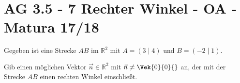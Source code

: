 \section{AG 3.5 - 7 Rechter Winkel - OA - Matura 17/18}

\begin{beispiel}[AG 3.5]{1} %
Gegeben ist eine Strecke $AB$ im $\mathbb{R}^2$ mit $A=(3\mid 4)$ und $B=(-2\mid 1)$.

Gib einen möglichen Vektor $\vec{n}\in\mathbb{R}^2$ mit $\vec{n}\neq\Vek{0}{0}{}$ an, der mit der Strecke $AB$ einen rechten Winkel einschließt.\leer

\end{beispiel}
